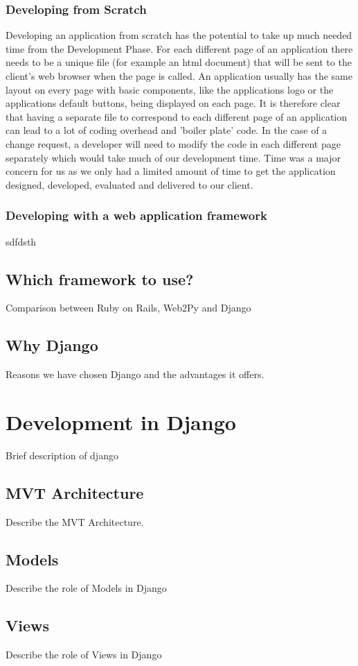 \documentclass{l3proj}
\begin{document}
\subsubsection{ Developing from Scratch}
Developing an application from scratch has the potential to take up much needed time 
from the Development Phase. For each different page of an application there needs to be 
a unique file (for example an html document) that will be sent to the client's web browser 
when the page is called. An application usually has the same layout on every page with 
basic components, like the applications logo or the applications default buttons, being 
displayed on each page. It is therefore clear that having a separate file to correspond to 
each different page of an application can lead to a lot of coding overhead and 'boiler 
plate' code. In the case of a change request, a developer will need to modify the code in 
each different page separately which would take much of our development time. Time was a major concern for us as we only had a limited amount of time to get the application designed, developed, evaluated and delivered to our client. \subsubsection{Developing with a web application framework}
sdfdsth
\subsection {Which framework to use?}
Comparison between Ruby on Rails, Web2Py and Django
\subsection {Why Django}
Reasons we have chosen Django and the advantages it offers.
\section{Development in Django}
Brief description of django
\subsection{MVT Architecture}
Describe the MVT Architecture.
\subsection{Models}
Describe the role of Models in Django
\subsection{Views}
Describe the role of Views in Django
\end{document}
